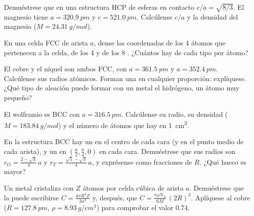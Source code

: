 \begin{exercise}[$\star\star$]\label{exo:b1:crystals-metals:6}
Demuéstrese que en una estructura HCP de esferas en contacto
$c/a = \sqrt{8/3}$. El magnesio tiene $a = \qty{320.9}{pm}$ y
$c = \qty{521.0}{pm}$. Calcúlense $c/a$ y la densidad del magnesio
($M = \qty{24.31}{g/mol}$).
\end{exercise}

\begin{exercise}[$\star\star$]\label{exo:b1:crystals-metals:7}
En una celda FCC de arista $a$, dense las coordenadas de los 4 átomos que
pertenecen a la celda, de los 4  y de los 8 . ¿Cuántos hay de cada tipo por átomo?
\end{exercise}

\begin{exercise}[$\star\star$]\label{exo:b1:crystals-metals:8}
El cobre y el níquel son ambos FCC, con $a = \qty{361.5}{pm}$ y
$a = \qty{352.4}{pm}$. Calcúlense sus radios atómicos. Forman una
 en cualquier proporción: explíquese. ¿Qué tipo de
aleación puede formar con un metal el hidrógeno, un átomo muy pequeño?
\end{exercise}

\begin{exercise}[$\star\star$]\label{exo:b1:crystals-metals:9}
El wolframio es BCC con $a = \qty{316.5}{pm}$. Calcúlense su radio, su
densidad ($M = \qty{183.84}{g/mol}$) y el número de átomos que hay en
\qty{1}{cm^3}.
\end{exercise}

\begin{exercise}[$\star\star\star$]\label{exo:b1:crystals-metals:10}
En la estructura BCC hay un  en el centro de cada cara (y
en el punto medio de cada arista), y un  en
$(\frac{a}{2}, \frac{a}{4}, 0)$ en cada cara. Demuéstrese que sus radios
son $r_O = \frac{2 - \sqrt3}{4}\,a$ y
$r_T = \frac{\sqrt5 - \sqrt3}{4}\,a$, y exprésense como fracciones de
$R$. ¿Qué hueco es mayor?
\end{exercise}

\begin{exercise}[$\star\star\star$]\label{exo:b1:crystals-metals:11}
Un metal cristaliza con $Z$ átomos por celda cúbica de arista $a$.
Demuéstrese que la  puede escribirse $C = \frac{4\pi R^3 Z}{3a^3}$
y, después, que
$C = \frac{\pi\rho N_A}{6M}\,(2R)^3$. Aplíquese al cobre ($R = \qty{127.8}{pm}$,
$\rho = \qty{8.93}{g/cm^3}$) para comprobar el valor $0.74$.
\end{exercise}

